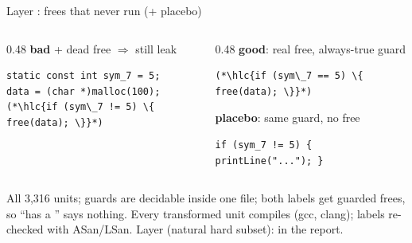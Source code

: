 \begin{frame}[fragile]{Layer : frees that never run (+ placebo)}
  \centering
  \vspace{2pt}
  \begin{columns}[T]
    \begin{column}{0.48\textwidth}
      {\small \textbf{bad} + dead free $\Rightarrow$ still \alert{leak}}
\begin{lstlisting}[style=unit]
static const int sym_7 = 5;
data = (char *)malloc(100);
(*\hlc{if (sym\_7 != 5) \{ free(data); \}}*)
\end{lstlisting}
    \end{column}
    \begin{column}{0.48\textwidth}
      {\small \textbf{good}: real free, always-true guard}
\begin{lstlisting}[style=unit]
(*\hlc{if (sym\_7 == 5) \{ free(data); \}}*)
\end{lstlisting}
      {\small \textbf{placebo}: same guard, no free}
\begin{lstlisting}[style=unit]
if (sym_7 != 5) { printLine("..."); }
\end{lstlisting}
    \end{column}
  \end{columns}
  \vfill
  {\scriptsize All 3,316 units; guards are decidable inside one file; both labels get guarded frees, so ``has a '' says nothing.
  Every transformed unit compiles (gcc, clang); labels re-checked with ASan/LSan. Layer  (natural hard subset): in the report.\par}
\end{frame}

